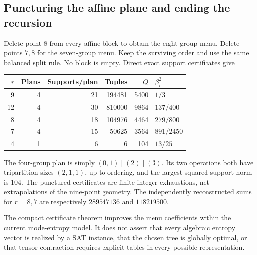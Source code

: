 \subsection{Puncturing the affine plane and ending the recursion}
Delete point $8$ from every affine block to obtain the eight-group menu.
Delete points $7,8$ for the seven-group menu. Keep the surviving order and
use the same balanced split rule. No block is empty. Direct exact support
certificates give
\begin{center}
\begin{tabular}{rrrrrl}
\toprule $r$ & Plans & Supports/plan & Tuples & $Q$ & $\beta_r^2$\\\midrule
9 &4&21&194481&5400&$1/3$\\
12&4&30&810000&9864&$137/400$\\
8 &4&18&104976&4464&$279/800$\\
7 &4&15&50625&3564&$891/2450$\\
4 &1&6&6&104&$13/25$\\
\bottomrule
\end{tabular}
\end{center}
The four-group plan is simply $(0,1)\mid(2)\mid(3)$. Its two operations
both have tripartition sizes $(2,1,1)$, up to ordering, and the largest
squared support norm is $104$. The punctured certificates are finite
integer exhaustions, not extrapolations of the nine-point geometry.
The independently reconstructed sums for $r=8,7$ are respectively
$289547136$ and $118219500$.

The compact certificate theorem improves the menu coefficients within the
current mode-entropy model. It does not assert that every algebraic entropy
vector is realized by a SAT instance, that the chosen tree is globally
optimal, or that tensor contraction requires explicit tables in every
possible representation.
